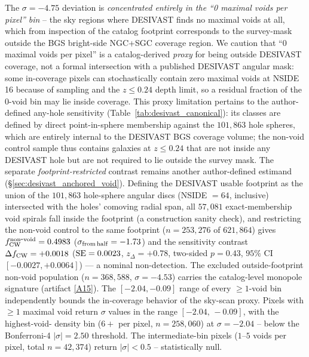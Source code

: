 \documentclass[aps,prd,twocolumn,superscriptaddress,showpacs,preprintnumbers,nofootinbib,longbibliography,floatfix]{revtex4-2}
\newcommand{\repoBase}{https://github.com/Hubify-Projects/bigbounce/blob/main}
\begin{document}
The $\sigma = -4.75$ deviation is \emph{concentrated entirely in the
``0 maximal voids per pixel'' bin} -- the sky regions where DESIVAST
finds no maximal voids at all, which from inspection of the catalog
footprint corresponds to the survey-mask outside the BGS bright-side
NGC+SGC coverage region. We caution that ``$0$ maximal voids per
pixel'' is a catalog-derived \emph{proxy} for being outside DESIVAST
coverage, not a formal intersection with a published DESIVAST angular
mask: some in-coverage pixels can stochastically contain zero maximal
voids at NSIDE\,16 because of sampling and the $z \leq 0.24$ depth
limit, so a residual fraction of the $0$-void bin may lie inside
coverage. This proxy limitation pertains to the author-defined
any-hole sensitivity (Table~\ref{tab:desivast_canonical}): its classes are
defined by direct point-in-sphere membership against the $101{,}863$
hole spheres, which are entirely internal to the DESIVAST BGS coverage
volume; the non-void control sample thus contains galaxies at
$z \leq 0.24$ that are not inside any DESIVAST hole but are not
required to lie outside the survey mask. The separate
\emph{footprint-restricted} contrast remains another author-defined
estimand (\S\ref{sec:desivast_anchored_void}). Defining the DESIVAST usable
footprint as the union of the $101{,}863$ hole-sphere angular discs
(NSIDE $= 64$, inclusive) intersected with the holes' comoving radial
span, all $57{,}081$ exact-membership void spirals fall inside the
footprint (a construction sanity check), and restricting the non-void
control to the same footprint ($n = 253{,}276$ of $621{,}864$) gives
$f_{\rm CW}^{\rm non\mbox{-}void} = 0.4983$ ($\sigma_{\rm from\,half} =
-1.73$) and the sensitivity contrast $\Delta f_{\rm CW} = +0.0018$
(${\rm SE} = 0.0023$, $z_\Delta = +0.78$, two-sided $p = 0.43$,
$95\%$ CI $[-0.0027, +0.0064]$) --- a nominal non-detection. The excluded
outside-footprint non-void population ($n = 368{,}588$,
$\sigma = -4.53$) carries the catalog-level monopole signature
(artifact
\href{\repoBase/pipelines/p5\_desi\_chirality/outputs/29\_ext3\_desivast\_footprint\_retabulation.json}{[A15]}).
The $[-2.04, -0.09]$ range of every $\geq\!1$-void bin independently bounds
the in-coverage behavior of the sky-scan proxy. Pixels with $\geq 1$ maximal void return
$\sigma$ values in the range $[-2.04,\,-0.09]$, with the highest-void-
density bin ($6+$ per pixel, $n = 258{,}060$) at $\sigma = -2.04$ --
below the Bonferroni-4 $|\sigma| = 2.50$ threshold. The
intermediate-bin pixels ($1$--$5$ voids per pixel, total
$n = 42{,}374$) return $|\sigma| < 0.5$ -- statistically null.
\end{document}
